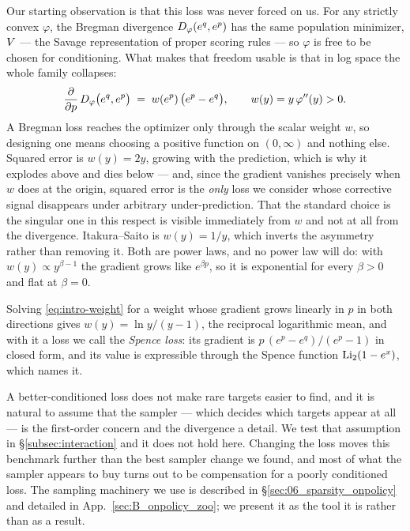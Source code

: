 Our starting observation is that this loss was never forced on us. For any
strictly convex $\varphi$, the Bregman divergence $D_{\varphi}(e^{q},e^{p})$ has the
same population minimizer, $V$ --- the Savage representation of proper
scoring rules \citep{savage1971elicitation,gneiting2007proper,banerjee2005clustering}
--- so $\varphi$ is free to be chosen for conditioning. What makes that freedom
usable is that in log space the whole family collapses:
\begin{equation}
  \frac{\partial}{\partial p}\,D_{\varphi}\big(e^{q},e^{p}\big)
  \;=\; w(e^{p})\,\big(e^{p}-e^{q}\big),
  \qquad w(y)=y\,\varphi''(y)>0 .
  \label{eq:intro-weight}
\end{equation}
A Bregman loss reaches the optimizer only through the scalar weight $w$, so
designing one means choosing a positive function on $(0,\infty)$ and nothing
else. Squared error is $w(y)=2y$, growing with the prediction, which is why it
explodes above and dies below --- and, since the gradient vanishes precisely
when $w$ does at the origin, squared error is the \emph{only} loss we consider
whose corrective signal disappears under arbitrary under-prediction. That the
standard choice is the singular one in this respect is visible immediately from
$w$ and not at all from the divergence. Itakura--Saito is $w(y)=1/y$, which
inverts the asymmetry rather than removing it. Both are power laws, and no power law will
do: with $w(y)\propto y^{\beta-1}$ the gradient grows like $e^{\beta p}$, so it
is exponential for every $\beta>0$ and flat at $\beta=0$.

Solving \eqref{eq:intro-weight} for a weight whose gradient grows linearly in
$p$ in both directions gives $w(y)=\ln y/(y-1)$, the reciprocal logarithmic
mean, and with it a loss we call the \emph{Spence loss}: its gradient is
$p\,(e^{p}-e^{q})/(e^{p}-1)$ in closed form, and its value is expressible
through the Spence function $\mathrm{Li}_2(1-e^{x})$, which names it.

A better-conditioned loss does not make rare targets easier to find, and it is
natural to assume that the sampler --- which decides which targets appear at
all --- is the first-order concern and the divergence a detail. We test that
assumption in \S\ref{subsec:interaction} and it does not hold here. Changing
the loss moves this benchmark further than the best sampler change we found,
and most of what the sampler appears to buy turns out to be compensation for a
poorly conditioned loss. The sampling machinery we use is described in
\S\ref{sec:06_sparsity_onpolicy} and detailed in
App.~\ref{sec:B_onpolicy_zoo}; we present it as the tool it is rather than as a
result.

